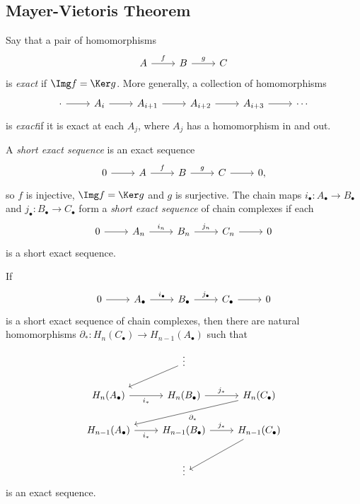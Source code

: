 \documentclass[12pt]{article}
\begin{document}
\subsection{Mayer-Vietoris Theorem}
\label{sub:mvt}

\begin{definition}
	Say that a pair of homomorphisms
	\[
	\begin{tikzcd}
		A \arrow[r, "f"] & B \arrow[r, "g"] & C
	\end{tikzcd}
	\]
	is \emph{exact} if $\Img f = \Ker g$. More generally, a collection of homomorphisms
	 \[
	\begin{tikzcd}
		\cdot \arrow[r] & A_i \arrow[r] & A_{i+1} \arrow[r] & A_{i+2} \arrow[r] & A_{i+3} \arrow[r] & \cdots
	\end{tikzcd}
	\]
	is \emph{exact}if it is exact at each $A_j$, where $A_j$ has a homomorphism in and out.

	A \emph{short exact sequence} is an exact sequence
	\[
	\begin{tikzcd}
		0 \arrow[r] & A \arrow[r, "f"] & B \arrow[r, "g"] & C \arrow[r] & 0,
	\end{tikzcd}
	\]
	so $f$ is injective, $\Img f = \Ker g$ and $g$ is surjective. The chain maps $i_\bullet : A_\bullet \to B_\bullet$ and  $j_\bullet : B_\bullet \to C_\bullet$ form a \emph{short exact sequence} of chain complexes if each
	\[
	\begin{tikzcd}
		0 \arrow[r] & A_n \arrow[r, "i_n"] & B_n \arrow[r, "j_n"] & C_n \arrow[r] & 0
	\end{tikzcd}
	\]
	is a short exact sequence.
\end{definition}

\begin{theorem}
	If
	\[
	\begin{tikzcd}
		0 \arrow[r] & A_\bullet \arrow[r, "i_\bullet"] & B_\bullet \arrow[r, "j_\bullet"] & C_\bullet \arrow[r] & 0
	\end{tikzcd}
	\]
	is a short exact sequence of chain complexes, then there are natural homomorphisms $\partial_\ast : H_n(C_\bullet) \to H_{n-1}(A_\bullet)$ such that
	\begin{equation*}
	\begin{tikzcd}
		& \vdots \arrow[dl] & \\
		 H_n(A_\bullet) \arrow[r, "i_\ast"'] & H_n(B_\bullet) \arrow[r, "j_\ast"] & H_n(C_\bullet) \arrow[dll, "\partial_\ast"] \\
						    H_{n-1}(A_\bullet) \arrow[r, "i_\ast"'] & H_{n-1}(B_\bullet) \arrow[r, "j_\ast"] & H_{n-1}(C_\bullet) \arrow[dl] \\
						    & \vdots &
	\end{tikzcd}
	\end{equation*}
	is an exact sequence.
\end{theorem}
\end{document}
